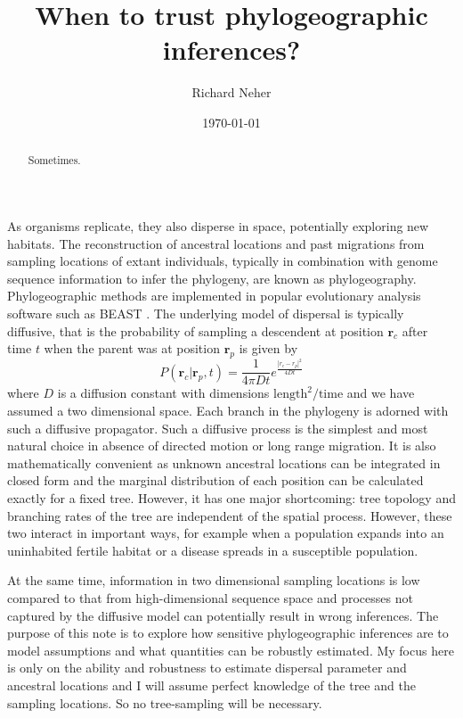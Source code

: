 \documentclass[aps,rmp, onecolumn]{revtex4}
\newcommand{\rvec}{\mathbf{r}}
\begin{document}
\title{When to trust phylogeographic inferences?}
\author{Richard Neher}
\date{\today}
\begin{abstract}
    Sometimes.
\end{abstract}

\maketitle
As organisms replicate, they also disperse in space, potentially exploring new habitats.
The reconstruction of ancestral locations and past migrations from sampling locations of extant individuals, typically in combination with genome sequence information to infer the phylogeny, are known as phylogeography.
Phylogeographic methods are implemented in popular evolutionary analysis software such as BEAST \citep{pybus_unifying_2012}.
The underlying model of dispersal is typically diffusive, that is the probability of sampling a descendent at position $\rvec_c$ after time $t$ when the parent was at position $\rvec_p$ is given by
\begin{equation}
    P(\rvec_c| \rvec_p, t) = \frac{1}{4\pi D t}e^{\frac{|r_c - r_p|^2}{4Dt}}
\end{equation}
where $D$ is a diffusion constant with dimensions $\mathrm{length}^2/\mathrm{time}$ and we have assumed a two dimensional space.
Each branch in the phylogeny is adorned with such a diffusive propagator.
Such a diffusive process is the simplest and most natural choice in absence of directed motion or long range migration.
It is also mathematically convenient as unknown ancestral locations can be integrated in closed form and the marginal distribution of each position can be calculated exactly for a fixed tree.
However, it has one major shortcoming: tree topology and branching rates of the tree are independent of the spatial process.
However, these two interact in important ways, for example when a population expands into an uninhabited fertile habitat or a disease spreads in a susceptible population.

At the same time, information in two dimensional sampling locations is low compared to that from high-dimensional sequence space and processes not captured by the diffusive model can potentially result in wrong inferences.
The purpose of this note is to explore how sensitive phylogeographic inferences are to model assumptions and what quantities can be robustly estimated.
My focus here is only on the ability and robustness to estimate dispersal parameter and ancestral locations and I will assume perfect knowledge of the tree and the sampling locations.
So no tree-sampling will be necessary.
\end{document}
